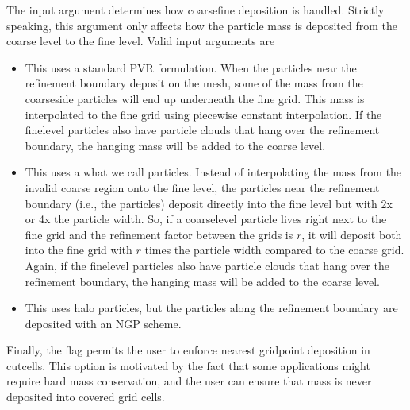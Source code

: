 \documentclass[letterpaper,10pt,english]{sphinxmanual}
\begin{document}
\sphinxAtStartPar
The input argument  determines how coarse\sphinxhyphen{}fine deposition is handled.
Strictly speaking, this argument only affects how the particle mass is deposited from the coarse level to the fine level.
Valid input arguments are
\begin{itemize}
\item {} 
\sphinxAtStartPar
{} This uses a standard PVR formulation.
When the particles near the refinement boundary deposit on the mesh, some of the mass from the coarse\sphinxhyphen{}side particles will end up underneath the fine grid.
This mass is interpolated to the fine grid using piecewise constant interpolation.
If the fine\sphinxhyphen{}level particles also have particle clouds that hang over the refinement boundary, the hanging mass will be added to the coarse level.

\item {} 
\sphinxAtStartPar
{} This uses a what we call  particles.
Instead of interpolating the mass from the invalid coarse region onto the fine level, the particles near the refinement boundary (i.e., the  particles) deposit directly into the fine level but with 2x or 4x the particle width.
So, if a coarse\sphinxhyphen{}level particle lives right next to the fine grid and the refinement factor between the grids is \(r\), it will deposit both into the fine grid with \(r\) times the particle width compared to the coarse grid.
Again, if the fine\sphinxhyphen{}level particles also have particle clouds that hang over the refinement boundary, the hanging mass will be added to the coarse level.

\item {} 
\sphinxAtStartPar
{} This uses halo particles, but the particles along the refinement boundary are deposited with an NGP scheme.

\end{itemize}

\sphinxAtStartPar
Finally, the flag  permits the user to enforce nearest grid\sphinxhyphen{}point deposition in cut\sphinxhyphen{}cells.
This option is motivated by the fact that some applications might require hard mass conservation, and the user can ensure that mass is never deposited into covered grid cells.
\end{document}
